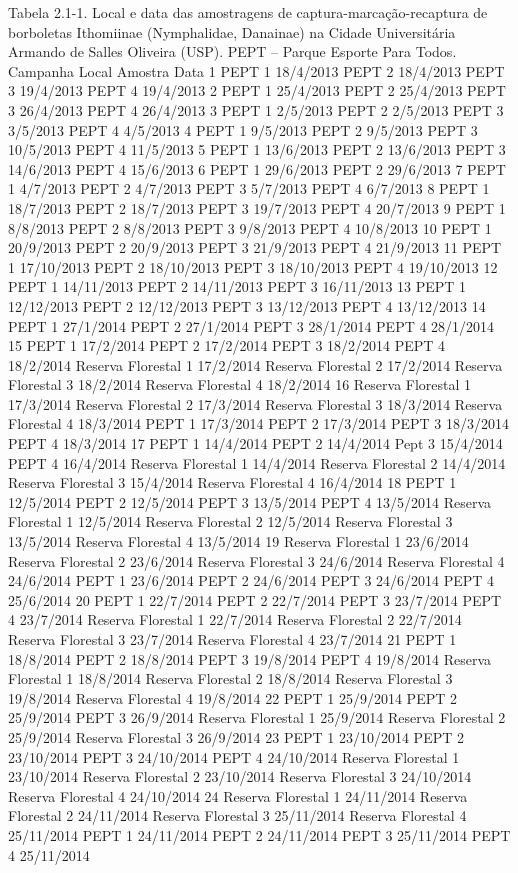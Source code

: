 Tabela 2.1-1. Local e data das amostragens de captura-marcação-recaptura de borboletas Ithomiinae (Nymphalidae, Danainae) na Cidade Universitária Armando de Salles Oliveira (USP). PEPT – Parque Esporte Para Todos.
Campanha	Local	Amostra	Data
1	PEPT	1	18/4/2013
	PEPT	2	18/4/2013
	PEPT	3	19/4/2013
	PEPT	4	19/4/2013
2	PEPT	1	25/4/2013
	PEPT	2	25/4/2013
	PEPT	3	26/4/2013
	PEPT	4	26/4/2013
3	PEPT	1	2/5/2013
	PEPT	2	2/5/2013
	PEPT	3	3/5/2013
	PEPT	4	4/5/2013
4	PEPT	1	9/5/2013
	PEPT	2	9/5/2013
	PEPT	3	10/5/2013
	PEPT	4	11/5/2013
5	PEPT	1	13/6/2013
	PEPT	2	13/6/2013
	PEPT	3	14/6/2013
	PEPT	4	15/6/2013
6	PEPT	1	29/6/2013
	PEPT	2	29/6/2013
7	PEPT	1	4/7/2013
	PEPT	2	4/7/2013
	PEPT	3	5/7/2013
	PEPT	4	6/7/2013
8	PEPT	1	18/7/2013
	PEPT	2	18/7/2013
	PEPT	3	19/7/2013
	PEPT	4	20/7/2013
9	PEPT	1	8/8/2013
	PEPT	2	8/8/2013
	PEPT	3	9/8/2013
	PEPT	4	10/8/2013
10	PEPT	1	20/9/2013
	PEPT	2	20/9/2013
	PEPT	3	21/9/2013
	PEPT	4	21/9/2013
11	PEPT	1	17/10/2013
	PEPT	2	18/10/2013
	PEPT	3	18/10/2013
	PEPT	4	19/10/2013
12	PEPT	1	14/11/2013
	PEPT	2	14/11/2013
	PEPT	3	16/11/2013
13	PEPT	1	12/12/2013
	PEPT	2	12/12/2013
	PEPT	3	13/12/2013
	PEPT	4	13/12/2013
14	PEPT	1	27/1/2014
	PEPT	2	27/1/2014
	PEPT	3	28/1/2014
	PEPT	4	28/1/2014
15	PEPT	1	17/2/2014
	PEPT	2	17/2/2014
	PEPT	3	18/2/2014
	PEPT	4	18/2/2014
	Reserva Florestal	1	17/2/2014
	Reserva Florestal	2	17/2/2014
	Reserva Florestal	3	18/2/2014
	Reserva Florestal	4	18/2/2014
16	Reserva Florestal	1	17/3/2014
	Reserva Florestal	2	17/3/2014
	Reserva Florestal	3	18/3/2014
	Reserva Florestal	4	18/3/2014
	PEPT	1	17/3/2014
	PEPT	2	17/3/2014
	PEPT	3	18/3/2014
	PEPT	4	18/3/2014
17	PEPT	1	14/4/2014
	PEPT	2	14/4/2014
	Pept	3	15/4/2014
	PEPT	4	16/4/2014
	Reserva Florestal	1	14/4/2014
	Reserva Florestal	2	14/4/2014
	Reserva Florestal	3	15/4/2014
	Reserva Florestal	4	16/4/2014
18	PEPT	1	12/5/2014
	PEPT	2	12/5/2014
	PEPT	3	13/5/2014
	PEPT	4	13/5/2014
	Reserva Florestal	1	12/5/2014
	Reserva Florestal	2	12/5/2014
	Reserva Florestal	3	13/5/2014
	Reserva Florestal	4	13/5/2014
19	Reserva Florestal	1	23/6/2014
	Reserva Florestal	2	23/6/2014
	Reserva Florestal	3	24/6/2014
	Reserva Florestal	4	24/6/2014
	PEPT	1	23/6/2014
	PEPT	2	24/6/2014
	PEPT	3	24/6/2014
	PEPT	4	25/6/2014
20	PEPT	1	22/7/2014
	PEPT	2	22/7/2014
	PEPT	3	23/7/2014
	PEPT	4	23/7/2014
	Reserva Florestal	1	22/7/2014
	Reserva Florestal	2	22/7/2014
	Reserva Florestal	3	23/7/2014
	Reserva Florestal	4	23/7/2014
21	PEPT	1	18/8/2014
	PEPT	2	18/8/2014
	PEPT	3	19/8/2014
	PEPT	4	19/8/2014
	Reserva Florestal	1	18/8/2014
	Reserva Florestal	2	18/8/2014
	Reserva Florestal	3	19/8/2014
	Reserva Florestal	4	19/8/2014
22	PEPT	1	25/9/2014
	PEPT	2	25/9/2014
	PEPT	3	26/9/2014
	Reserva Florestal	1	25/9/2014
	Reserva Florestal	2	25/9/2014
	Reserva Florestal	3	26/9/2014
23	PEPT	1	23/10/2014
	PEPT	2	23/10/2014
	PEPT	3	24/10/2014
	PEPT	4	24/10/2014
	Reserva Florestal	1	23/10/2014
	Reserva Florestal	2	23/10/2014
	Reserva Florestal	3	24/10/2014
	Reserva Florestal	4	24/10/2014
24	Reserva Florestal	1	24/11/2014
	Reserva Florestal	2	24/11/2014
	Reserva Florestal	3	25/11/2014
	Reserva Florestal	4	25/11/2014
	PEPT	1	24/11/2014
	PEPT	2	24/11/2014
	PEPT	3	25/11/2014
	PEPT	4	25/11/2014


